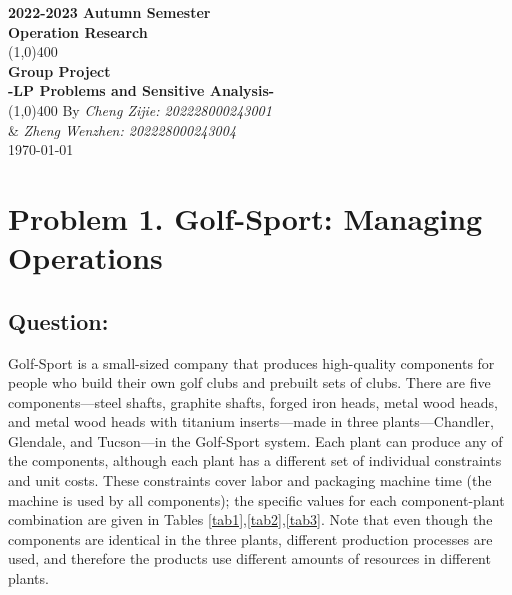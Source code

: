 \documentclass[12pt]{article}
\begin{document}
	
	\begin{titlepage}
		\begin{center}
			\vspace*{1cm}
			\Large{\textbf{2022-2023 Autumn Semester}}\\
			\Large{\textbf{Operation Research}}\\
			\vfill
			\line(1,0){400}\\[1mm]
			\huge{\textbf{Group Project}}\\[3mm]
			\Large{\textbf{-LP Problems and Sensitive Analysis-}}\\[1mm]
			\line(1,0){400}
			\vfill
			By \emph{Cheng Zijie: 202228000243001 }\\ 
			\& \emph{Zheng Wenzhen: 202228000243004}\\
			\today \\
		\end{center}
	\end{titlepage}
	
	\tableofcontents
	\thispagestyle{empty}
	\clearpage
	\setcounter{page}{1}
	\section{Problem 1. Golf-Sport: Managing Operations
	}
	\subsection{Question:}
	\noindent Golf-Sport is a small-sized company that produces high-quality components for people who build their own golf clubs and prebuilt sets of clubs. There are five components—steel shafts, graphite shafts, forged iron heads, metal wood heads, and metal wood heads with titanium inserts—made in three plants—Chandler, Glendale, and Tucson—in the Golf-Sport system. Each plant can produce any of the components, although each plant has a different set of individual constraints and unit costs. These constraints cover labor and packaging machine time (the machine is used by all components); the specific values for each component-plant combination are given in Tables \ref{tab1},\ref{tab2},\ref{tab3}. Note that even though the components are identical in the three plants, different production processes are used, and therefore the products use different amounts of resources in different plants.
\end{document}
